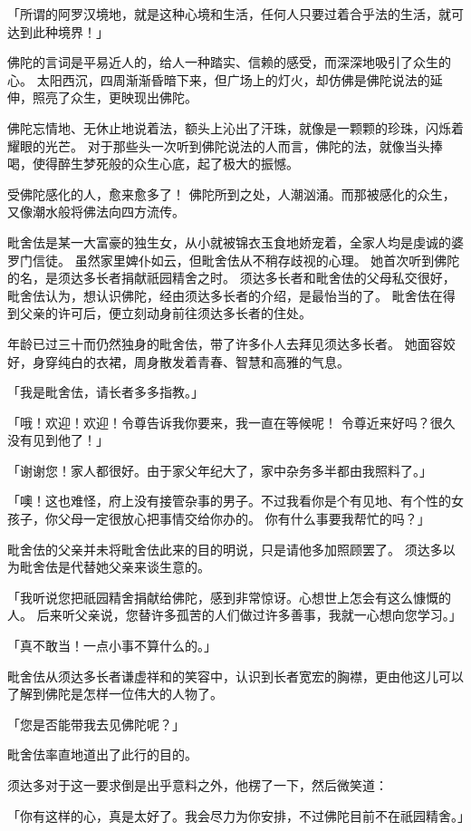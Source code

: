 \documentclass[twoside,openany]{book}
\begin{document}
「所谓的阿罗汉境地，就是这种心境和生活，任何人只要过着合乎法的生活，就可达到此种境界！」

佛陀的言词是平易近人的，给人一种踏实、信赖的感受，而深深地吸引了众生的心。
太阳西沉，四周渐渐昏暗下来，但广场上的灯火，却仿佛是佛陀说法的延伸，照亮了众生，更映现出佛陀。

佛陀忘情地、无休止地说着法，额头上沁出了汗珠，就像是一颗颗的珍珠，闪烁着耀眼的光芒。
对于那些头一次听到佛陀说法的人而言，佛陀的法，就像当头捧喝，使得醉生梦死般的众生心底，起了极大的振憾。

受佛陀感化的人，愈来愈多了！
佛陀所到之处，人潮汹涌。而那被感化的众生，又像潮水般将佛法向四方流传。

毗舍佉是某一大富豪的独生女，从小就被锦衣玉食地娇宠着，全家人均是虔诚的婆罗门信徒。
虽然家里婢仆如云，但毗舍佉从不稍存歧视的心理。
她首次听到佛陀的名，是须达多长者捐献祇园精舍之时。
须达多长者和毗舍佉的父母私交很好，毗舍佉认为，想认识佛陀，经由须达多长者的介绍，是最怡当的了。
毗舍佉在得到父亲的许可后，便立刻动身前往须达多长者的住处。

年龄已过三十而仍然独身的毗舍佉，带了许多仆人去拜见须达多长者。
她面容姣好，身穿纯白的衣裙，周身散发着青春、智慧和高雅的气息。

「我是毗舍佉，请长者多多指教。」

「哦！欢迎！欢迎！令尊告诉我你要来，我一直在等候呢！
令尊近来好吗？很久没有见到他了！」

「谢谢您！家人都很好。由于家父年纪大了，家中杂务多半都由我照料了。」

「噢！这也难怪，府上没有接管杂事的男子。不过我看你是个有见地、有个性的女孩子，你父母一定很放心把事情交给你办的。
你有什么事要我帮忙的吗？」

毗舍佉的父亲并未将毗舍佉此来的目的明说，只是请他多加照顾罢了。
须达多以为毗舍佉是代替她父亲来谈生意的。

「我听说您把祇园精舍捐献给佛陀，感到非常惊讶。心想世上怎会有这么慷慨的人。
后来听父亲说，您替许多孤苦的人们做过许多善事，我就一心想向您学习。」

「真不敢当！一点小事不算什么的。」

毗舍佉从须达多长者谦虚祥和的笑容中，认识到长者宽宏的胸襟，更由他这儿可以了解到佛陀是怎样一位伟大的人物了。

「您是否能带我去见佛陀呢？」

毗舍佉率直地道出了此行的目的。

须达多对于这一要求倒是出乎意料之外，他楞了一下，然后微笑道：

「你有这样的心，真是太好了。我会尽力为你安排，不过佛陀目前不在祇园精舍。」
\end{document}
